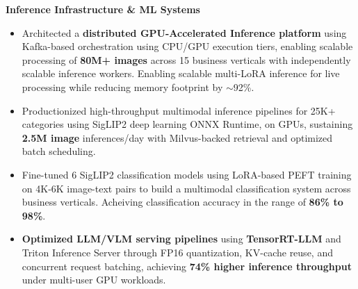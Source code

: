 \documentclass[10pt,a4paper]{article}
\begin{document}
\vspace{0pt}
\textbf{Inference Infrastructure \& ML Systems}
\begin{itemize}[leftmargin=*,
itemsep=1pt,
topsep=0pt,
parsep=1pt,
partopsep=1pt]

\item Architected a \textbf{distributed GPU-Accelerated Inference platform} using Kafka-based orchestration using CPU/GPU execution tiers, enabling scalable processing of \textbf{80M+ images} across 15 business verticals with independently scalable inference workers. Enabling scalable multi-LoRA inference for live processing while reducing memory footprint by $\sim$92\%.


\item Productionized high-throughput multimodal inference pipelines for 25K+ categories using SigLIP2 deep learning ONNX Runtime, on GPUs, sustaining \textbf{2.5M image} inferences/day with Milvus-backed retrieval and optimized batch scheduling.

\item Fine-tuned 6 SigLIP2 classification models using LoRA-based PEFT training on 4K-6K image-text pairs to build a multimodal classification system across business verticals. Acheiving classification accuracy in the range of \textbf{86\% to 98\%}.




\item \textbf{Optimized LLM/VLM serving pipelines} using \textbf{TensorRT-LLM} and Triton Inference Server through FP16 quantization, KV-cache reuse, and concurrent request batching, achieving \textbf{74\% higher inference throughput} under multi-user GPU workloads.


\end{itemize}
\end{document}
